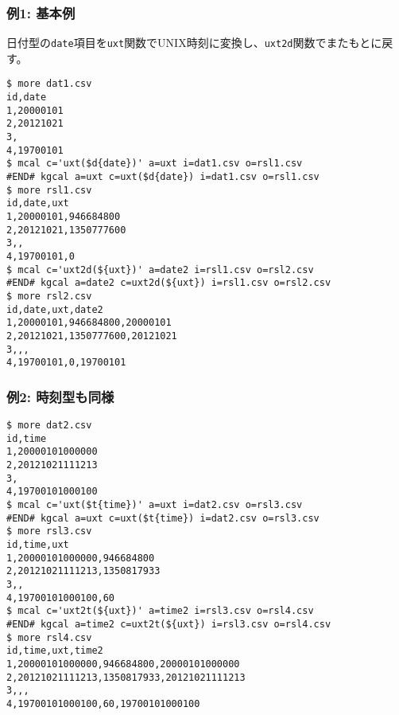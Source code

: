 \subsubsection*{例1: 基本例}

日付型の\verb|date|項目を\verb|uxt|関数でUNIX時刻に変換し、\verb|uxt2d|関数でまたもとに戻す。


\begin{Verbatim}[baselinestretch=0.7,frame=single]
$ more dat1.csv
id,date
1,20000101
2,20121021
3,
4,19700101
$ mcal c='uxt($d{date})' a=uxt i=dat1.csv o=rsl1.csv
#END# kgcal a=uxt c=uxt($d{date}) i=dat1.csv o=rsl1.csv
$ more rsl1.csv
id,date,uxt
1,20000101,946684800
2,20121021,1350777600
3,,
4,19700101,0
$ mcal c='uxt2d(${uxt})' a=date2 i=rsl1.csv o=rsl2.csv
#END# kgcal a=date2 c=uxt2d(${uxt}) i=rsl1.csv o=rsl2.csv
$ more rsl2.csv
id,date,uxt,date2
1,20000101,946684800,20000101
2,20121021,1350777600,20121021
3,,,
4,19700101,0,19700101
\end{Verbatim}
\subsubsection*{例2: 時刻型も同様}



\begin{Verbatim}[baselinestretch=0.7,frame=single]
$ more dat2.csv
id,time
1,20000101000000
2,20121021111213
3,
4,19700101000100
$ mcal c='uxt($t{time})' a=uxt i=dat2.csv o=rsl3.csv
#END# kgcal a=uxt c=uxt($t{time}) i=dat2.csv o=rsl3.csv
$ more rsl3.csv
id,time,uxt
1,20000101000000,946684800
2,20121021111213,1350817933
3,,
4,19700101000100,60
$ mcal c='uxt2t(${uxt})' a=time2 i=rsl3.csv o=rsl4.csv
#END# kgcal a=time2 c=uxt2t(${uxt}) i=rsl3.csv o=rsl4.csv
$ more rsl4.csv
id,time,uxt,time2
1,20000101000000,946684800,20000101000000
2,20121021111213,1350817933,20121021111213
3,,,
4,19700101000100,60,19700101000100
\end{Verbatim}
